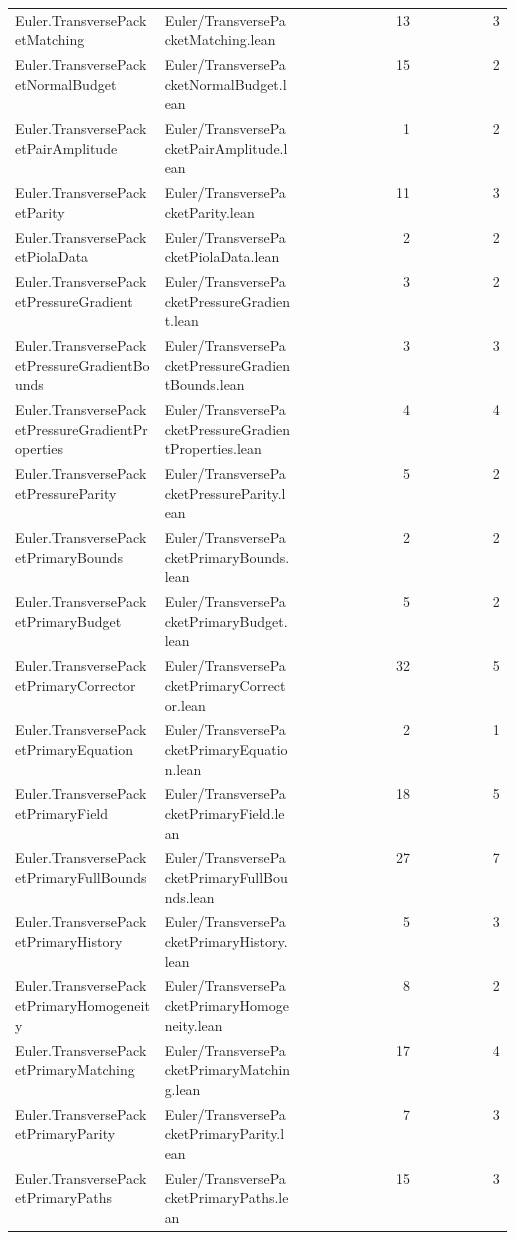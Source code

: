 \begin{longtable}{p{0.30\linewidth}p{0.28\linewidth}rr}
Euler.TransversePacketMatching & Euler/TransversePacketMatching.lean & 13 & 3\\
Euler.TransversePacketNormalBudget & Euler/TransversePacketNormalBudget.lean & 15 & 2\\
Euler.TransversePacketPairAmplitude & Euler/TransversePacketPairAmplitude.lean & 1 & 2\\
Euler.TransversePacketParity & Euler/TransversePacketParity.lean & 11 & 3\\
Euler.TransversePacketPiolaData & Euler/TransversePacketPiolaData.lean & 2 & 2\\
Euler.TransversePacketPressureGradient & Euler/TransversePacketPressureGradient.lean & 3 & 2\\
Euler.TransversePacketPressureGradientBounds & Euler/TransversePacketPressureGradientBounds.lean & 3 & 3\\
Euler.TransversePacketPressureGradientProperties & Euler/TransversePacketPressureGradientProperties.lean & 4 & 4\\
Euler.TransversePacketPressureParity & Euler/TransversePacketPressureParity.lean & 5 & 2\\
Euler.TransversePacketPrimaryBounds & Euler/TransversePacketPrimaryBounds.lean & 2 & 2\\
Euler.TransversePacketPrimaryBudget & Euler/TransversePacketPrimaryBudget.lean & 5 & 2\\
Euler.TransversePacketPrimaryCorrector & Euler/TransversePacketPrimaryCorrector.lean & 32 & 5\\
Euler.TransversePacketPrimaryEquation & Euler/TransversePacketPrimaryEquation.lean & 2 & 1\\
Euler.TransversePacketPrimaryField & Euler/TransversePacketPrimaryField.lean & 18 & 5\\
Euler.TransversePacketPrimaryFullBounds & Euler/TransversePacketPrimaryFullBounds.lean & 27 & 7\\
Euler.TransversePacketPrimaryHistory & Euler/TransversePacketPrimaryHistory.lean & 5 & 3\\
Euler.TransversePacketPrimaryHomogeneity & Euler/TransversePacketPrimaryHomogeneity.lean & 8 & 2\\
Euler.TransversePacketPrimaryMatching & Euler/TransversePacketPrimaryMatching.lean & 17 & 4\\
Euler.TransversePacketPrimaryParity & Euler/TransversePacketPrimaryParity.lean & 7 & 3\\
Euler.TransversePacketPrimaryPaths & Euler/TransversePacketPrimaryPaths.lean & 15 & 3\\

\end{longtable}
